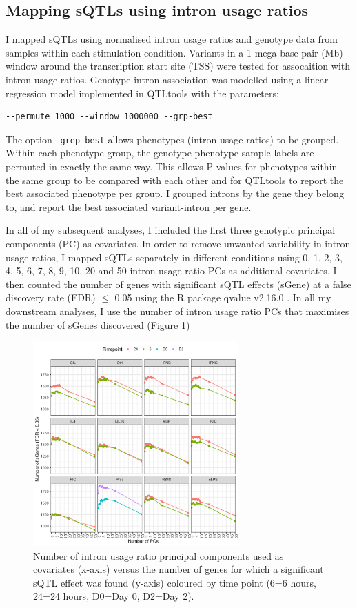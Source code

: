 \subsection{Mapping sQTLs using intron usage ratios}
I mapped sQTLs using normalised intron usage ratios and genotype data from samples within each stimulation condition. Variants in a 1 mega base pair (Mb) window around the transcription start site (TSS) were tested for assocaition with intron usage ratios. Genotype-intron association was modelled using a linear regression model implemented in QTLtools \cite{Delaneau2017-dg} with the parameters:
\begin{verbatim}
--permute 1000 --window 1000000 --grp-best
\end{verbatim}
The option \Verb+-grep-best+ allows phenotypes (intron usage ratios) to be grouped. Within each phenotype group, the genotype-phenotype sample labels are permuted in exactly the same way. This allows P-values for phenotypes within the same group to be compared with each other and for QTLtools to report the best associated phenotype per group. I grouped introns by the gene they belong to, and report the best associated variant-intron per gene.

In all of my subsequent analyses, I included the first three genotypic principal components (PC) as covariates. In order to remove unwanted variability in intron usage ratios, I mapped sQTLs separately in different conditions using 0, 1, 2, 3, 4, 5, 6, 7, 8, 9, 10, 20 and 50  intron usage ratio PCs as additional covariates. I then counted the number of genes with significant sQTL effects (sGene) at a false discovery rate (FDR) $\leq$ 0.05 using the R package qvalue v2.16.0 \cite{Storey2003-zd}. In all my downstream analyses, I use the number of intron usage ratio PCs that maximises the number of sGenes discovered (Figure \ref{fig:num_sgenes_PCs})

\begin{figure}[H]
  \centering
  \includegraphics[width=0.7\textwidth]{num_sgenes_PCs}
  \caption{Number of intron usage ratio principal components used as
  covariates (x-axis) versus the number of genes for which a significant sQTL effect was found
  (y-axis) coloured by time point (6=6 hours, 24=24 hours, D0=Day 0, D2=Day 2).}
  \label{fig:num_sgenes_PCs}   
\end{figure}


